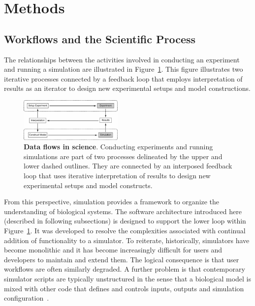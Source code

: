 \documentclass[11pt,3p,twocolumn]{JMN}
\begin{document}
\section{Methods}

\subsection{Workflows and the Scientific Process}

The relationships between the activities involved in conducting an experiment and running a simulation are illustrated in Figure~\ref{fig:exp-sim}. This figure illustrates two iterative processes connected by a feedback loop that employs interpretation of results as an iterator to design new experimental setups and model constructions.

\begin{figure}[h!t]
  \begin{center}
    \includegraphics[width=0.45\textwidth]{figures/exp-sim.pdf}
  \end{center}
  \caption{ \small{\textbf{Data flows in science}. Conducting experiments and running simulations are part of two processes delineated by the upper and lower dashed outlines. They are connected by an interposed feedback loop that uses iterative interpretation of results to design new experimental setups and model constructs.}}
    \label{fig:exp-sim}
\end{figure}

From this perspective, simulation provides a framework to organize the understanding of biological systems. The software architecture introduced here (described in following subsections) is designed to support the lower loop within Figure~\ref{fig:exp-sim}. It was developed to resolve the complexities associated with continual addition of functionality to a simulator. To reiterate, historically, simulators have become monolithic and it has become increasingly difficult for users and developers to maintain and extend them. The logical consequence is that user workflows are often similarly degraded. A further problem is that contemporary simulator scripts are typically unstructured in the sense that a biological model is mixed with other code that defines and controls inputs, outputs and simulation configuration~\citep{cannon07:_inter}.
\end{document}

